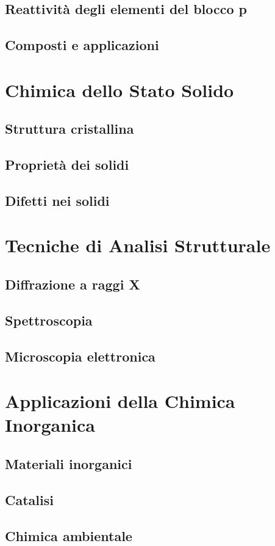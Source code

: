 \subsection{Reattività degli elementi del blocco p}
\subsection{Composti e applicazioni}

\section{Chimica dello Stato Solido}
\subsection{Struttura cristallina}
\subsection{Proprietà dei solidi}
\subsection{Difetti nei solidi}

\section{Tecniche di Analisi Strutturale}
\subsection{Diffrazione a raggi X}
\subsection{Spettroscopia}
\subsection{Microscopia elettronica}

\section{Applicazioni della Chimica Inorganica}
\subsection{Materiali inorganici}
\subsection{Catalisi}
\subsection{Chimica ambientale}
